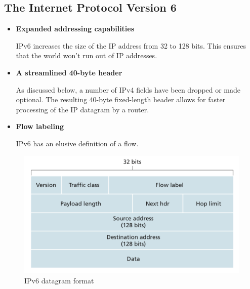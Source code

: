 \documentclass[11pt]{article}
\begin{document}
\subsection{The Internet Protocol Version 6}

\begin{itemize}
	\item \textbf{Expanded addressing capabilities}
	
	IPv6 increases the size of the IP address from 32 to 128 bits. This ensures that the world won’t run out of IP addresses.
	
	\item \textbf{A streamlined 40-byte header}
	
	As discussed below, a number of IPv4 fields have been dropped or made optional. The resulting 40-byte fixed-length header allows for faster processing of the IP datagram by a router.
	
	\item \textbf{Flow labeling}
	
	IPv6 has an elusive definition of a flow.
	
\end{itemize}

\begin{figure}[h]
	\centering
	\includegraphics[width=0.8\linewidth]{images/ipv6.png}
	\caption{IPv6 datagram format}
	\label{fig:ipv6}
\end{figure}
\end{document}

